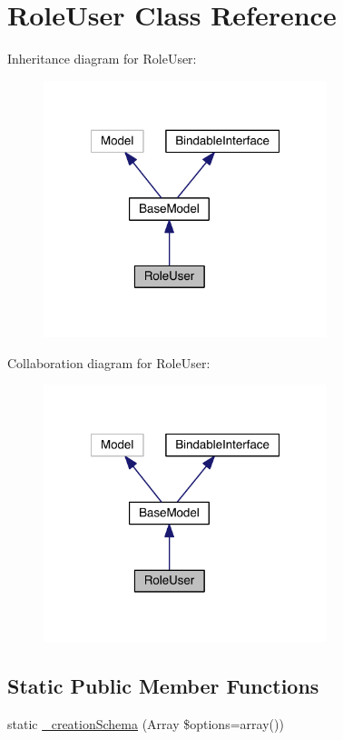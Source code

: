 \hypertarget{class_security_1_1_role_user}{\section{Role\-User Class Reference}
\label{class_security_1_1_role_user}
}


Inheritance diagram for Role\-User\-:
\nopagebreak
\begin{figure}[H]
\begin{center}
\leavevmode
\includegraphics[width=234pt]{class_security_1_1_role_user__inherit__graph}
\end{center}
\end{figure}


Collaboration diagram for Role\-User\-:
\nopagebreak
\begin{figure}[H]
\begin{center}
\leavevmode
\includegraphics[width=234pt]{class_security_1_1_role_user__coll__graph}
\end{center}
\end{figure}
\subsection*{Static Public Member Functions}
\begin{DoxyCompactItemize}
\item 
static \hyperlink{class_security_1_1_role_user_a0c47f287a3df4cf59d56b00b761a603c}{\-\_\-creation\-Schema} (Array \$options=array())
\end{DoxyCompactItemize}
